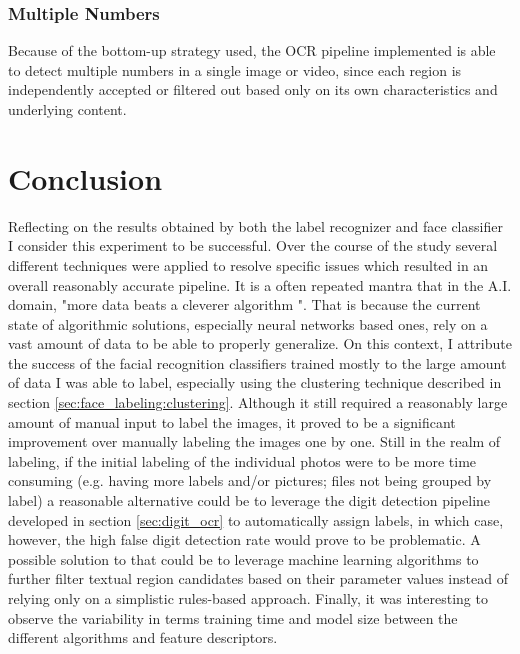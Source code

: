 \documentclass[11pt]{article}
\begin{document}
    \subsubsection{Multiple Numbers}
        Because of the bottom-up strategy used, the OCR pipeline implemented is able to detect multiple numbers in a single image or video, since each region is independently accepted or filtered out based only on its own characteristics and underlying content.

\section{Conclusion}\label{sec:conclusion}
    Reflecting on the results obtained by both the label recognizer and face classifier I consider this experiment to be successful. Over the course of the study several different techniques were applied to resolve specific issues which resulted in an overall reasonably accurate pipeline. It is a often repeated mantra that in the A.I. domain, "more data beats a cleverer algorithm ". That is because the current state of algorithmic solutions, especially neural networks based ones, rely on a vast amount of data to be able to properly generalize. On this context, I attribute the success of the facial recognition classifiers trained mostly to the large amount of data I was able to label, especially using the clustering technique described in section \ref{sec:face_labeling:clustering}. Although it still required a reasonably large amount of manual input to label the images, it proved to be a significant improvement over manually labeling the images one by one. Still in the realm of labeling, if the initial labeling of the individual photos were to be more time consuming (e.g. having more labels and/or pictures; files not being grouped by label) a reasonable alternative could be to leverage the digit detection pipeline developed in section \ref{sec:digit_ocr} to automatically assign labels, in which case, however, the high false digit detection rate would prove to be problematic. A possible solution to that could be to leverage machine learning algorithms to further filter textual region candidates based on their parameter values instead of relying only on a simplistic rules-based approach. Finally, it was interesting to observe the variability in terms training time and model size between the different algorithms and feature descriptors.
\end{document}
